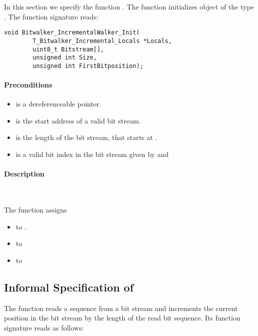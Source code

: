 In this section we specify the function \init.
 The function  initializes object of the type \bitwalkertype.
The function signature reads:\\[1em]


\begin{lstlisting}[style=acsl-block]
void Bitwalker_IncrementalWalker_Init(
        T_Bitwalker_Incremental_Locals *Locals,
        uint8_t Bitstream[],
        unsigned int Size,
        unsigned int FirstBitposition);
\end{lstlisting}


\paragraph{Preconditions}
\begin{itemize}
   \item  {} is a dereferenceable pointer.
   \item {} is  the start address of a valid bit stream.
   \item {} is the length of the bit stream, that starts at .
   \item {} is a valid bit index in the bit stream given by  and 
\end{itemize}

\paragraph{Description}~

The function \init assigns
\begin{itemize}
    \item {}  to .
    \item {} to 
    \item {} to 
\end{itemize}

\clearpage

\subsection{Informal Specification of }

The function \peeknext reads a sequence from a bit stream 
and increments the current position in the bit stream by the 
length of the read bit sequence.
Its function signature reads as follows:\\[1em]



